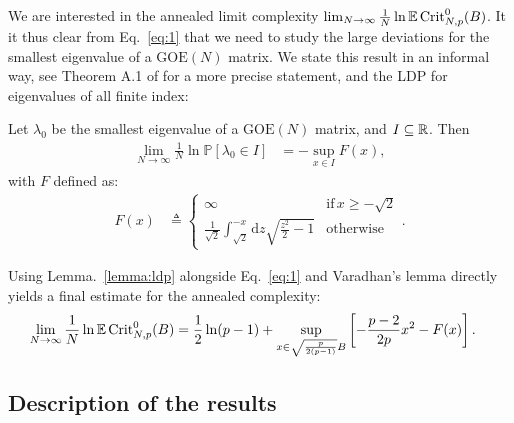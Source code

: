 \documentclass[amsmath,amssymb,nofootinbib,prd]{article}
\begin{document}
		
	We are interested in the annealed limit complexity	$\lim_{N \to \infty} \frac{1}{N} \ln \mathbb{E} \, \mathrm{Crit}_{N,p}^0(B)$. It it thus clear from Eq.~\ref{eq:1} that we need to study the large deviations for the smallest eigenvalue of a $\mathrm{GOE}(N)$ matrix. We state this result in an informal way, see Theorem A.1 of \cite{auffinger2013random} for a more precise statement, and the LDP for eigenvalues of all finite index:
\begin{lemma}[Informal]\label{lemma:ldp}
Let $\lambda_0$ be the smallest eigenvalue of a $\mathrm{GOE}(N)$ matrix, and $I \subseteq \mathbb{R}$. Then
\begin{align}
\lim_{N \to \infty} \frac{1}{N} \ln \mathbb{P}\left[\lambda_0 \in I\right] &= - \sup_{x \in I} F(x),
\end{align}
with $F$ defined as:
\begin{align}
F(x) &\triangleq \begin{cases} \infty &\mathrm{if}\,x \geq -\sqrt{2}  \\
 \frac{1}{\sqrt{2}} \int_{\sqrt{2}}^{-x} \mathrm{d}z\sqrt{\frac{z^2}{2} -1} & \mathrm{otherwise}
\end{cases}.
\end{align}
\end{lemma}
Using Lemma.~\ref{lemma:ldp} alongside Eq.~\ref{eq:1} and Varadhan's lemma directly yields a final estimate for the annealed complexity:
\begin{align}\label{eq:2}
\lim_{N \to \infty} \frac{1}{N} \ln \mathbb{E} \, \mathrm{Crit}_{N,p}^0(B) &= \frac{1}{2} \ln (p-1) + \sup_{x \in \sqrt{\frac{p}{2(p-1)}} B} \left[-\frac{p-2}{2p}x^2 - F(x)\right].
\end{align}
	
	\subsection{Description of the results}\label{subsec:summary}
	
\end{document}
